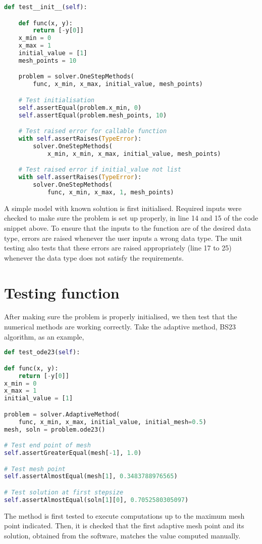 \begin{lstlisting}[language=Python, caption= {initialisation testing}, title={Testing initialisation of problem}, label={code:test_init}]
def test__init__(self):

    def func(x, y):
        return [-y[0]]
    x_min = 0
    x_max = 1
    initial_value = [1]
    mesh_points = 10

    problem = solver.OneStepMethods(
        func, x_min, x_max, initial_value, mesh_points)

    # Test initialisation
    self.assertEqual(problem.x_min, 0)
    self.assertEqual(problem.mesh_points, 10)

    # Test raised error for callable function
    with self.assertRaises(TypeError):
        solver.OneStepMethods(
            x_min, x_min, x_max, initial_value, mesh_points)

    # Test raised error if initial_value not list
    with self.assertRaises(TypeError):
        solver.OneStepMethods(
            func, x_min, x_max, 1, mesh_points)
\end{lstlisting}
A simple model with known solution is first initialised. Required inputs were checked to make sure the problem is set up properly, in line 14 and 15 of the code snippet above. To ensure that the inputs to the function are of the desired data type, errors are raised whenever the user inputs a wrong data type. The unit testing also tests that these errors are raised appropriately (line 17 to 25) whenever the data type does not satisfy the requirements. 

\section{Testing function}
\label{sec:test_func}
After making sure the problem is properly initialised, we then test that the numerical methods are working correctly. Take the adaptive method, BS23 algorithm, as an example, 
\begin{lstlisting}[language=Python, caption= {testing of function}, title={Testing execution of method}, label={code:test_func}]
def test_ode23(self):

def func(x, y):
    return [-y[0]]
x_min = 0
x_max = 1
initial_value = [1]

problem = solver.AdaptiveMethod(
    func, x_min, x_max, initial_value, initial_mesh=0.5)
mesh, soln = problem.ode23()

# Test end point of mesh
self.assertGreaterEqual(mesh[-1], 1.0)

# Test mesh point
self.assertAlmostEqual(mesh[1], 0.3483788976565)

# Test solution at first stepsize
self.assertAlmostEqual(soln[1][0], 0.7052580305097)
\end{lstlisting}
The method is first tested to execute computations up to the maximum mesh point indicated. Then, it is checked that the first adaptive mesh point and its solution, obtained from the software, matches the value computed manually. 